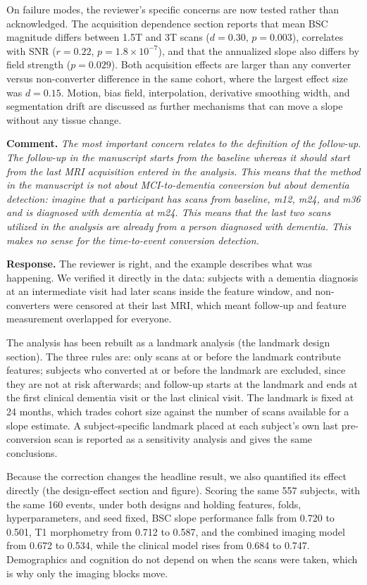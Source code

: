 \documentclass[11pt]{article}
\newcommand{\comment}[1]{\vspace{6pt}\noindent\textbf{Comment.} \textit{#1}\par\vspace{2pt}}
\newcommand{\response}{\noindent\textbf{Response.} }
\begin{document}
On failure modes, the reviewer's specific concerns are now tested rather than acknowledged. The acquisition dependence section reports that mean BSC magnitude differs between 1.5T and 3T scans ($d = 0.30$, $p = 0.003$), correlates with SNR ($r = 0.22$, $p = 1.8\times10^{-7}$), and that the annualized slope also differs by field strength ($p = 0.029$). Both acquisition effects are larger than any converter versus non-converter difference in the same cohort, where the largest effect size was $d = 0.15$. Motion, bias field, interpolation, derivative smoothing width, and segmentation drift are discussed as further mechanisms that can move a slope without any tissue change.

\comment{The most important concern relates to the definition of the follow-up. The follow-up in the manuscript starts from the baseline whereas it should start from the last MRI acquisition entered in the analysis. This means that the method in the manuscript is not about MCI-to-dementia conversion but about dementia detection: imagine that a participant has scans from baseline, m12, m24, and m36 and is diagnosed with dementia at m24. This means that the last two scans utilized in the analysis are already from a person diagnosed with dementia. This makes no sense for the time-to-event conversion detection.}

\response The reviewer is right, and the example describes what was happening. We verified it directly in the data: subjects with a dementia diagnosis at an intermediate visit had later scans inside the feature window, and non-converters were censored at their last MRI, which meant follow-up and feature measurement overlapped for everyone.

The analysis has been rebuilt as a landmark analysis (the landmark design section). The three rules are: only scans at or before the landmark contribute features; subjects who converted at or before the landmark are excluded, since they are not at risk afterwards; and follow-up starts at the landmark and ends at the first clinical dementia visit or the last clinical visit. The landmark is fixed at 24 months, which trades cohort size against the number of scans available for a slope estimate. A subject-specific landmark placed at each subject's own last pre-conversion scan is reported as a sensitivity analysis and gives the same conclusions.

Because the correction changes the headline result, we also quantified its effect directly (the design-effect section and figure). Scoring the same 557 subjects, with the same 160 events, under both designs and holding features, folds, hyperparameters, and seed fixed, BSC slope performance falls from 0.720 to 0.501, T1 morphometry from 0.712 to 0.587, and the combined imaging model from 0.672 to 0.534, while the clinical model rises from 0.684 to 0.747. Demographics and cognition do not depend on when the scans were taken, which is why only the imaging blocks move.
\end{document}
